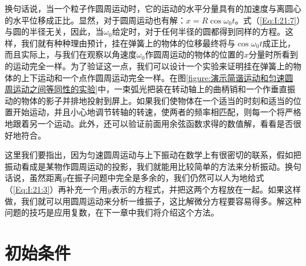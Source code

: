 换句话说，当一个粒子作圆周运动时，它的运动的水平分量具有的加速度与离圆心的水平位移成正比。显然，对于圆周运动也有解：$x=R\cos\omega_0t$。式（\ref{Eq:I:21:7}）与圆的半径无关，因此，当$\omega_0$给定时，对于任何半径的圆都得到同样的方程。这样，我们就有种种理由预计，挂在弹簧上的物体的位移最终将与$\cos\omega_0t$成正比，而且实际上，与我们在观察以角速度$\omega_0$作圆周运动的物体的位置的$x$分量时所看到的运动完全一样。为了验证这一点，我们可以设计一个实验来证明挂在弹簧上的物体的上下运动和一个点作圆周运动完全一样。在图\ref{figure:演示简谐运动和匀速圆周运动之间等同性的实验}中，一束弧光把装在转动轴上的曲柄销和一个作垂直振动的物体的影子并排地投射到屏上。如果我们使物体在一个适当的时刻和适当的位置开始运动，并且小心地调节转轴的转速，使两者的频率相匹配，则每一个将严格地跟着另一个运动。此外，还可以验证前面用余弦函数求得的数值解，看看是否很好地符合。

这里我们要指出，因为匀速圆周运动与上下振动在数学上有很密切的联系，假如把振动看成是某物作圆周运动的投影，我们就能用比较简单的方法来分析振动。换句话说，虽然距离$y$在振子问题中完全是多余的，我们仍然可以人为地给式（\ref{Eq:I:21:3}）再补充一个用$y$表示的方程式，并把这两个方程放在一起。如果这样做，我们就可以用圆周运动来分析一维振子，这比解微分方程要容易得多。解这种问题的技巧是应用复数，在下一章中我们将介绍这个方法。

\section{初始条件}

